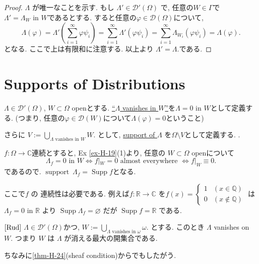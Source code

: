 \begin{proof}
\(\Lambda\) が唯一なことを示す. 
もし \(\Lambda' \in \mathcal{D}'(\Omega)\) で, 任意の$W \in \Gamma$で
 \(\Lambda' = \Lambda_W \text{ in } W \)であるとする. 
すると任意の\(\varphi \in \mathcal{D}(\Omega)\)について, 
\[
\Lambda(\varphi) = \Lambda'(\sum_{i=1}^\infty \varphi \psi_i) 
= \sum_{i=1}^\infty \Lambda'(\varphi \psi_i) 
= \sum_{i=1}^\infty \Lambda_{W_i}(\varphi \psi_i) = \Lambda(\varphi).
\]
となる. ここで上は有限和に注意する. 以上より
\(\Lambda' = \Lambda.\)である. 
\end{proof}


\section{Supports of Distributions}  

\begin{tcolorbox}[mybox]
\begin{defn}{\cite[Def 6.22]{Rud}}
\label{defn-H-22}
\(\Lambda \in \mathcal{D}'(\Omega)\), \(W \subset \Omega\) openとする. 
 \underline{“\(\Lambda\) vanishes in \(W\)”}を\(\Lambda = 0 \text{ in } W\)として定義する.   
(つまり, 任意の$\varphi \in \mathcal{D}(W)$について\(\Lambda(\varphi) = 0\)ということ)  

さらに
\(V := \bigcup_{\Lambda \text{ vanishes in } W} W\).  
として, \underline{support of \(\Lambda\)} を\(\Omega \setminus V\)として定義する. .  
\end{defn}
\end{tcolorbox}

\begin{ex}
\label{ex-H-23}
\(f: \Omega \to \mathbb{C}\)連続とすると, 
Ex \ref{ex-H-19}(1)より, 任意の \(W \subset \Omega\) openについて
\[
\Lambda_f = 0 \text{ in } W \iff f|_W = 0 \text{ almost everywhere } \iff f|_W \equiv 0.
\]
であるので. \( \operatorname{support} \ \Lambda_f = \operatorname{Supp} f \)となる. 

ここで\(f\) の 連続性は必要である. 
例えば\(f:\mathbb{R} \to \mathbb{C}\) を\(f(x) = \begin{cases}1 & (x \in \mathbb{Q}) \\ 0 & (x \notin \mathbb{Q})\end{cases}\) は  
\(\Lambda_f = 0 \text{ in } \mathbb{R}\) より \(\operatorname{Supp} \Lambda_f = \varnothing\) だが \(\operatorname{Supp} f = \mathbb{R}\) である. 
\end{ex}

\begin{tcolorbox}[mybox]
\begin{thm}{$\cite[Thm 6.23]{Rud}$}
\label{thm-H-24}
\(\Lambda \in \mathcal{D}'(\Omega)\)かつ, \(W := \bigcup_{\Lambda \text{ vanishes in } \omega} \omega\).  
とする. 
このとき \(\Lambda\) vanishes on \(W\).  つまり \(W\) は \(\Lambda\) が消える最大の開集合である.
\end{thm}
\end{tcolorbox}
ちなみに\ref{thm-H-24}(sheaf condition)からでもしたがう.

